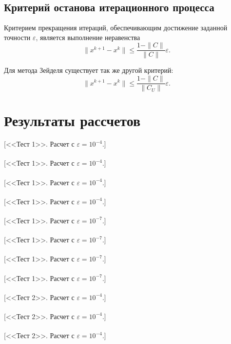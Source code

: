 \documentclass[12pt,a4paper]{article}
\begin{document}
\subsection{Критерий останова итерационного процесса}

Критерием прекращения итераций, обеспечивающим достижение заданной точности $\varepsilon$, является выполнение неравенства
$$
\|x^{k+1}-x^k\| \le \frac{1-\|C\|}{\|C\|}\varepsilon.
$$

Для метода Зейделя существует так же другой критерий:
$$
\|x^{k+1}-x^k\| \le \frac{1-\|C\|}{\|C_U\|}\varepsilon.
$$

\section{Результаты рассчетов}
[<<Тест 1>>. Расчет с $\varepsilon=10^{-4}$.]\\
\\
[<<Тест 1>>. Расчет с $\varepsilon=10^{-4}$.]\\
\\
[<<Тест 1>>. Расчет с $\varepsilon=10^{-4}$.]\\
\\
[<<Тест 1>>. Расчет с $\varepsilon=10^{-4}$.]\\
\\
[<<Тест 1>>. Расчет с $\varepsilon=10^{-7}$.]\\
\\
[<<Тест 1>>. Расчет с $\varepsilon=10^{-7}$.]\\
\\
[<<Тест 1>>. Расчет с $\varepsilon=10^{-7}$.]\\
\\
[<<Тест 1>>. Расчет с $\varepsilon=10^{-7}$.]\\
\\
[<<Тест 2>>. Расчет с $\varepsilon=10^{-4}$.]\\
\\
[<<Тест 2>>. Расчет с $\varepsilon=10^{-4}$.]\\
\\
[<<Тест 2>>. Расчет с $\varepsilon=10^{-4}$.]\\
\\
\end{document}
